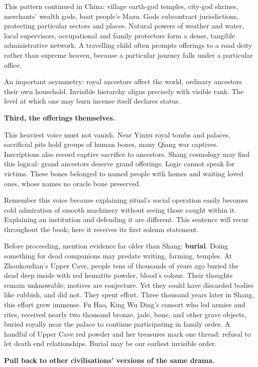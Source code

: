 This pattern continued in China: village earth-god temples, city-god shrines, merchants' wealth gods, boat people's Mazu. Gods subcontract jurisdictions, protecting particular sectors and places. Natural powers of weather and water, local supervisors, occupational and family protectors form a dense, tangible administrative network. A travelling child often prompts offerings to a road deity rather than supreme heaven, because a particular journey falls under a particular office.

An important asymmetry: royal ancestors affect the world, ordinary ancestors their own household. Invisible hierarchy aligns precisely with visible rank. The level at which one may burn incense itself declares status.

\textbf{Third, the offerings themselves.}

This heaviest voice must not vanish. Near Yinxu royal tombs and palaces, sacrificial pits hold groups of human bones, many Qiang war captives. Inscriptions also record captive sacrifice to ancestors. Shang cosmology may find this logical: grand ancestors deserve grand offerings. Logic cannot speak for victims. These bones belonged to named people with homes and waiting loved ones, whose names no oracle bone preserved.

Remember this voice because explaining ritual's social operation easily becomes cold admiration of smooth machinery without seeing those caught within it. Explaining an institution and defending it are different. This sentence will recur throughout the book; here it receives its first solemn statement.

Before proceeding, mention evidence far older than Shang: \textbf{burial}. Doing something for dead companions may predate writing, farming, temples. At Zhoukoudian's Upper Cave, people tens of thousands of years ago buried the dead deep inside with red hematite powder, blood's colour. Their thoughts remain unknowable; motives are conjecture. Yet they could have discarded bodies like rubbish, and did not. They spent effort. Three thousand years later in Shang, this effort grew immense. Fu Hao, King Wu Ding's consort who led armies and rites, received nearly two thousand bronze, jade, bone, and other grave objects, buried royally near the palace to continue participating in family order. A handful of Upper Cave red powder and her treasures mark one thread: refusal to let death end relationships. Burial may be our earliest invisible order.

\textbf{Pull back to other civilisations' versions of the same drama.}

